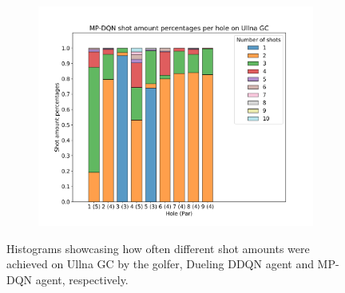 \documentclass{kththesis}
\begin{document}
\begin{figure}
\begin{subfigure}{\textwidth}
    \centering
    \includegraphics[height=0.3\textheight]{AgentPercentages/MPDQN_Shot_Percentages_Ullna.png} 
    \end{subfigure}
    \caption{Histograms showcasing how often different shot amounts were achieved on Ullna GC by the golfer, Dueling DDQN agent and MP-DQN agent, respectively.}
    \label{fig:ullna_shot_histograms}
\end{figure}
\end{document}
